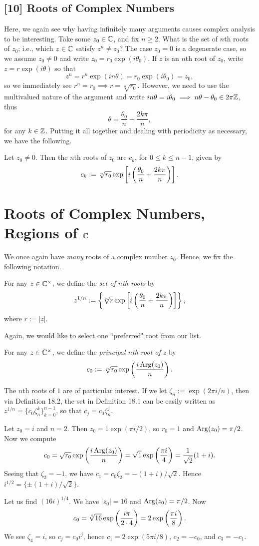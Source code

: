 \documentclass{article}
\begin{document}
\subsection*{[10] Roots of Complex Numbers}
Here, we again see why having infinitely many arguments causes complex analysis to be interesting. Take some $z_0\in \mathbb C$, and fix $n\geq 2$. What is the set of $n$th roots of $z_0$; i.e., which $z\in\mathbb C$ satisfy $z^n\neq z_0$? The case $z_0 = 0$ is a degenerate case, so we assume $z_0\neq 0$ and write $z_0 = r_0 \exp(i \theta_0)$. If $z$ is an $n$th root of $z_0$, write $z = r\exp(i\theta)$ so that
$$z^n = r^n\exp(in\theta) = r_0\exp(i\theta_0) = z_0,$$
so we immediately see $r^n = r_0 \implies r = \sqrt[n]{r_0}$. However, we need to use the multivalued nature of the argument and write $in\theta = i\theta_0 \implies n\theta - \theta_0 \in 2\pi \mathbb Z$, thus
$$\theta = \frac{\theta_0}n + \frac{2k\pi}n,$$
for any $k\in\mathbb Z$. Putting it all together and dealing with periodicity as necessary, we have the following.
\begin{proposition}
Let $z_0\neq 0$. Then the $n$th roots of $z_0$ are $c_k$, for $0\leq k\leq n-1$, given by
$$c_k := \sqrt[n]{r_0} \exp\left[i \left(\frac{\theta_0}n + \frac{2k\pi}{n} \right)\right].$$
\end{proposition}
\setcounter{section}{17}
\section{Roots of Complex Numbers, Regions of $\mathbb C$}
We once again have \textit{many} roots of a complex number $z_0$. Hence, we fix the following notation.
\begin{definition}
For any $z\in \mathbb C^\times$, we define the \textit{set of $n$th roots} by
$$z^{1/n} := \left\{\sqrt[n]{r} \exp\left[i \left(\frac{\theta_0}n + \frac{2k\pi}{n} \right)\right]\right\},$$
where $r := |z|$.
\end{definition}
Again, we would like to select one ``preferred" root from our list.
\begin{definition}
For any $z\in\mathbb C^\times$, we define the \textit{principal $n$th root of $z$} by
$$c_0 := \sqrt[n]{r_0} \exp\left(\frac{i\operatorname{Arg}(z_0)}n \right).$$
\end{definition}
The $n$th roots of $1$ are of particular interest. If we let $\zeta_n := \exp(2\pi i/n)$, then via Definition 18.2, the set in Definition 18.1 can be easily written as $z^{1/n} = \{c_0\zeta_n^k\}_{k=0}^{n-1}$, so that $c_j = c_0\zeta_n^j$.
\begin{example}
Let $z_0 = i$ and $n=2$. Then $z_0 = 1\exp(\pi i/2)$, so $r_0 = 1$ and $\operatorname{Arg}(z_0) = \pi/2$. Now we compute
$$c_0 = \sqrt{r_0}\exp\left(\frac{i\operatorname{Arg}(z_0)} n \right) = \sqrt 1\exp\left(\frac{\pi i}4 \right) = \frac 1{\sqrt 2}(1+i).$$
Seeing that $\zeta_2 = -1$, we have $c_1 = c_0\zeta_2 = -(1+i)/\sqrt 2$. Hence $i^{1/2} = \boxed{\{\pm(1+i)/\sqrt 2\}}$.
\end{example}
\begin{example}
Let us find $(16i)^{1/4}$. We have $|z_0| = 16$ and $\operatorname{Arg}(z_0) = \pi/2$. Now
$$c_0 = \sqrt[4]{16}\exp\left(\frac{i\pi}{2\cdot 4} \right) = 2\exp\left(\frac{\pi i}8 \right).$$
We see $\zeta_4=i$, so $c_j = c_0i^j$, hence $c_1 = 2\exp(5\pi i/8)$, $c_2 = -c_0$, and $c_3 = -c_1$.
\end{example}
\end{document}
